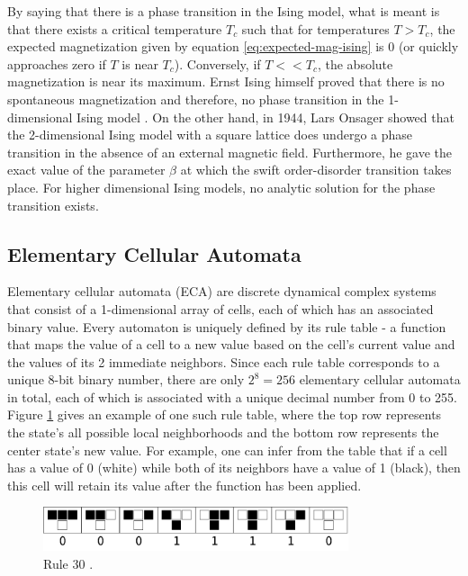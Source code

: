 \documentclass[12pt]{article}
\begin{document}
By saying that there is a phase transition in the Ising model, what is meant is that there exists a critical temperature $T_c$ such that for temperatures $T > T_c$, the expected magnetization given by equation \ref{eq:expected-mag-ising} is 0 (or quickly approaches zero if $T$ is near $T_c$). Conversely, if $T << T_c$, the absolute magnetization is near its maximum. Ernst Ising himself proved that there is no spontaneous magnetization and therefore, no phase transition in the 1-dimensional Ising model \cite{Ising1925}. On the other hand, in 1944, Lars Onsager showed \cite{lars-onsanger} that the 2-dimensional Ising model with a square lattice does undergo a phase transition in the absence of an external magnetic field. Furthermore, he gave the exact value of the parameter $\beta$ at which the swift order-disorder transition takes place. For higher dimensional Ising models, no analytic solution for the phase transition exists. 

\subsection{Elementary Cellular Automata}

Elementary cellular automata (ECA) are discrete dynamical complex systems that consist of a 1-dimensional array of cells, each of which has an associated binary value. Every automaton is uniquely defined by its rule table - a function that maps the value of a cell to a new value based on the cell's current value and the values of its 2 immediate neighbors. Since each rule table corresponds to a unique 8-bit binary number, there are only $2^8 = 256$ elementary cellular automata in total, each of which is associated with a unique decimal number from 0 to 255. Figure \ref{fig:eca-rule-table} gives an example of one such rule table, where the top row represents the state's all possible local neighborhoods and the bottom row represents the center state's new value. For example, one can infer from the table that if a cell has a value of 0 (white) while both of its neighbors have a value of 1 (black), then this cell will retain its value after the function has been applied. 

\begin{figure} [!h]
\begin{center}
\includegraphics[width=0.8\textwidth]{eca-rule-example}
\caption{Rule 30 \cite{weisstein-eca}.}
\label{fig:eca-rule-table}
\end{center}
\end{figure}
\end{document}
